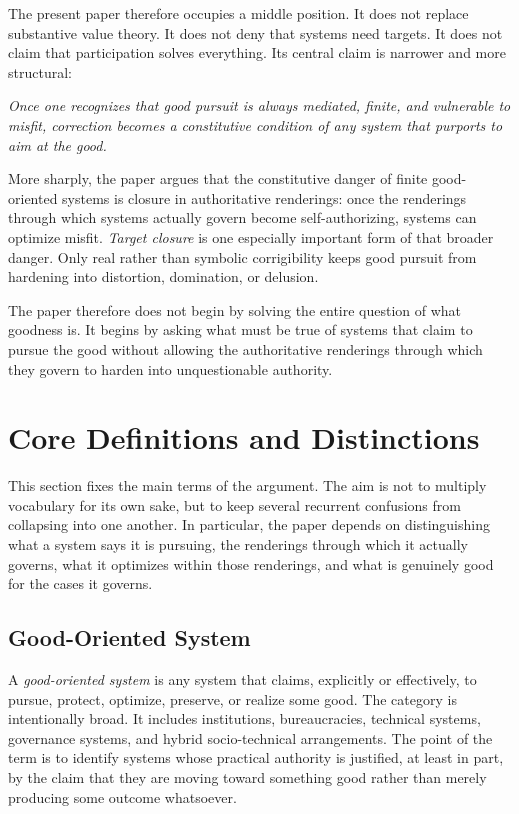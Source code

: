 \documentclass[11pt]{article}
\renewenvironment{quote}
  {\list{}{\leftmargin=1.4em \rightmargin=1.0em}%
   \item\relax\color{softink}\itshape}
  {\endlist}
\renewcommand{\emph}[1]{\textit{#1}}
\begin{document}
The present paper therefore occupies a middle position. It does not replace substantive value theory. It does not deny that systems need targets. It does not claim that participation solves everything. Its central claim is narrower and more structural:

\begin{quote}
Once one recognizes that good pursuit is always mediated, finite, and vulnerable to misfit, correction becomes a constitutive condition of any system that purports to aim at the good.
\end{quote}

More sharply, the paper argues that the constitutive danger of finite good-oriented systems is closure in authoritative renderings: once the renderings through which systems actually govern become self-authorizing, systems can optimize misfit. \emph{Target closure} is one especially important form of that broader danger. Only real rather than symbolic corrigibility keeps good pursuit from hardening into distortion, domination, or delusion.

The paper therefore does not begin by solving the entire question of what goodness is. It begins by asking what must be true of systems that claim to pursue the good without allowing the authoritative renderings through which they govern to harden into unquestionable authority.
\section{Core Definitions and Distinctions}

This section fixes the main terms of the argument. The aim is not to multiply vocabulary for its own sake, but to keep several recurrent confusions from collapsing into one another. In particular, the paper depends on distinguishing what a system says it is pursuing, the renderings through which it actually governs, what it optimizes within those renderings, and what is genuinely good for the cases it governs.

\subsection{Good-Oriented System}

A \emph{good-oriented system} is any system that claims, explicitly or effectively, to pursue, protect, optimize, preserve, or realize some good. The category is intentionally broad. It includes institutions, bureaucracies, technical systems, governance systems, and hybrid socio-technical arrangements. The point of the term is to identify systems whose practical authority is justified, at least in part, by the claim that they are moving toward something good rather than merely producing some outcome whatsoever.
\end{document}
